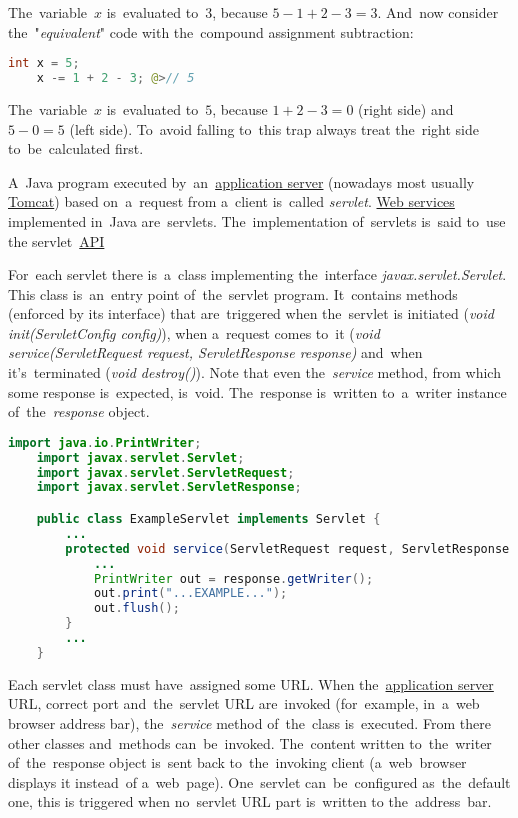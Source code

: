 \noindent The~variable~$x$ is~evaluated to~$3$, because $5-1+2-3=3$. And~now consider the~"\textit{equivalent}" code with the~compound assignment subtraction:
\begin{lstlisting}[language=Java, frame=no]
    int x = 5;
    x -= 1 + 2 - 3; @>// 5
\end{lstlisting}

\noindent The~variable~$x$ is~evaluated to~$5$, because $1+2-3=0$ (right side) and~$5-0=5$ (left side). To~avoid falling to~this trap always treat the~right side to~be~calculated first.

\label{serialization}

\label{servlet}
A~Java program executed by~an~\hyperref[applicationserver]{application server} (nowadays most usually \hyperref[tomcat]{Tomcat}) based on~a~request from a~client is~called \textit{servlet}. \hyperref[webserviceapplication]{Web services} implemented in~Java are~servlets. The~implementation of~servlets is~said to~use the servlet~\hyperref[api]{API}

For~each servlet there is~a~class implementing the~interface \textit{javax.servlet.Servlet}. This class is~an~entry point of~the~servlet program. It~contains methods (enforced by its interface) that are~triggered when the~servlet is initiated (\textit{void init(ServletConfig config)}), when a~request comes to~it (\textit{void service(ServletRequest request, ServletResponse response)} and~when it's~terminated (\textit{void destroy()}). Note that even the~\textit{service} method, from which some response is~expected, is~void. The~response is~written to~a~writer instance of~the~\textit{response} object.

\enlargethispage{10mm}
\example
\begin{lstlisting}[language=Java]
    import java.io.PrintWriter;
    import javax.servlet.Servlet;
    import javax.servlet.ServletRequest;
    import javax.servlet.ServletResponse;

    public class ExampleServlet implements Servlet {
        ...
        protected void service(ServletRequest request, ServletResponse response) {
            ...
            PrintWriter out = response.getWriter();
            out.print("...EXAMPLE...");
            out.flush();
        }
        ...
    }
\end{lstlisting}

\noindent Each servlet class must have~assigned some URL. When the~\hyperref[applicationserver]{application server} URL, correct port and~the~servlet URL are~invoked (for~example, in~a~web browser address bar), the~\textit{service} method of~the~class is~executed. From there other classes and~methods can~be~invoked. The~content written to~the~writer of~the~response object is~sent back to~the~invoking client (a~web~browser displays it instead~of a~web~page). One~servlet can~be~configured as~the~default one, this is triggered when no~servlet URL part is~written to the~address~bar.

